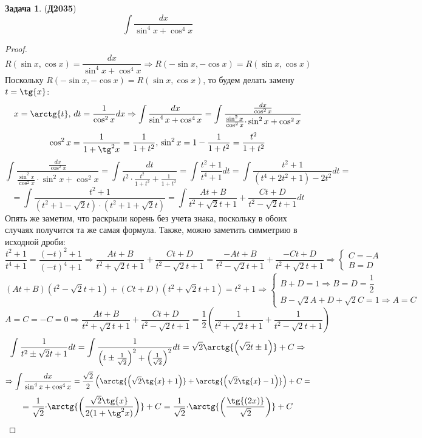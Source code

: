 \documentclass[12pt]{article}
\theoremstyle{definition}
\newtheorem{problem}{Задача}
\DeclareMathOperator{\dint}{\displaystyle\int}
\begin{document}
\begin{problem}(\textbf{Д2035})
	$$
		\dint\dfrac{dx}{\sin^4{x} + \cos^4{x}}
	$$
\end{problem}
\begin{proof}
	$$
		R(\sin{x},\cos{x}) = \dfrac{dx}{\sin^4{x} + \cos^4{x}} \Rightarrow R(-\sin{x}, -\cos{x}) = R(\sin{x},\cos{x})
	$$
	Поскольку $R(-\sin{x}, -\cos{x}) = R(\sin{x},\cos{x})$, то будем делать замену $t = \tg{x}$:
	$$
		x = \arctg{t}, \, dt = \dfrac{1}{\cos^2{x}}dx \Rightarrow \dint\dfrac{dx}{\sin^4{x} + \cos^4{x}} = \dint\dfrac{\tfrac{dx}{\cos^2{x}}}{\tfrac{\sin^2{x}}{\cos^2{x}}{\cdot}\sin^2{x} + \cos^2{x}} 
	$$
	$$
		\cos^2{x} = \dfrac{1}{1 + \tg^2{x}} = \dfrac{1}{1 + t^2}, \, \sin^2{x} = 1 - \dfrac{1}{1 + t^2} = \dfrac{t^2}{1 + t^2}
	$$
	$$
		\dint\dfrac{\tfrac{dx}{\cos^2{x}}}{\tfrac{\sin^2{x}}{\cos^2{x}}{\cdot}\sin^2{x} + \cos^2{x}}  = \dint \dfrac{dt}{t^2{\cdot}\tfrac{t^2}{1 +t^2} + \tfrac{1}{1 + t^2}} = \dint \dfrac{t^2 + 1}{t^4 + 1}dt = \dint \dfrac{t^2  + 1}{(t^4 +  2t^2 + 1)  - 2t^2}dt =  
	$$
	$$
		=	\dint \dfrac{t^2 + 1}{(t^2 + 1 - \sqrt{2}t){\cdot}(t^2 + 1 + \sqrt{2}t)} = \dint \dfrac{At + B}{t^2 + \sqrt{2}t + 1} + \dfrac{Ct + D}{t^2 - \sqrt{2}t +1} dt
	$$
	Опять же заметим, что раскрыли корень без учета знака, поскольку в обоих случаях получится та же самая формула. Также, можно заметить симметрию в исходной дроби:
	$$
		\dfrac{t^2 + 1}{t^4 + 1} = \dfrac{(-t)^2 + 1}{(-t)^4 + 1} \Rightarrow \dfrac{At + B}{t^2 + \sqrt{2}t + 1} + \dfrac{Ct + D}{t^2 - \sqrt{2}t +1} = \dfrac{-At + B}{t^2 - \sqrt{2}t + 1} + \dfrac{-Ct + D}{t^2 + \sqrt{2}t +1} \Rightarrow 
		\begin{cases}
			C = -A \\
			B = D
		\end{cases}
	$$
	$$
		(At + B)(t^2 - \sqrt{2}t + 1) +(Ct + D)(t^2 + \sqrt{2}t + 1) = t^2 + 1 \Rightarrow 
		\begin{cases}
			B + D = 1 \Rightarrow B = D = \dfrac{1}{2} \\ 
			B - \sqrt{2}A + D + \sqrt{2}C = 1 \Rightarrow  A = C
		\end{cases}
	$$
	$$
		A = C = -C = 0 \Rightarrow  \dfrac{At + B}{t^2 + \sqrt{2}t + 1} + \dfrac{Ct + D}{t^2 - \sqrt{2}t +1} = \dfrac{1}{2}\left(\dfrac{1}{t^2 + \sqrt{2}t + 1} + \dfrac{1}{t^2 - \sqrt{2}t +1}\right)
	$$
	$$
		\dint \dfrac{1}{t^2 \pm \sqrt{2}t + 1}dt = \dint \dfrac{1}{\left(t \pm \tfrac{1}{\sqrt{2}} \right)^2 + \left(\tfrac{1}{\sqrt{2}}\right)^2}dt = \sqrt{2}\arctg{ \left(\sqrt{2}t \pm 1 \right)} + C \Rightarrow
	$$
	$$
		\Rightarrow \dint\dfrac{dx}{\sin^4{x} + \cos^4{x}} = \dfrac{\sqrt{2}}{2}\left(\arctg{\left(\sqrt{2}\tg{x} + 1\right)} + \arctg{\left(\sqrt{2}\tg{x} - 1\right)}\right) + C =
	$$
	$$
		=\dfrac{1}{\sqrt{2}}{\cdot}\arctg{
			\left(
				\dfrac{\sqrt{2}\tg{x}}{2( 1 + \tg^2{x})}
			\right)
		} + C = \dfrac{1}{\sqrt{2}}{\cdot}\arctg{\left(
			\dfrac{\tg{(2x)} }{\sqrt{2}} 
		\right)}+ C
	$$
\end{proof}
\end{document}
